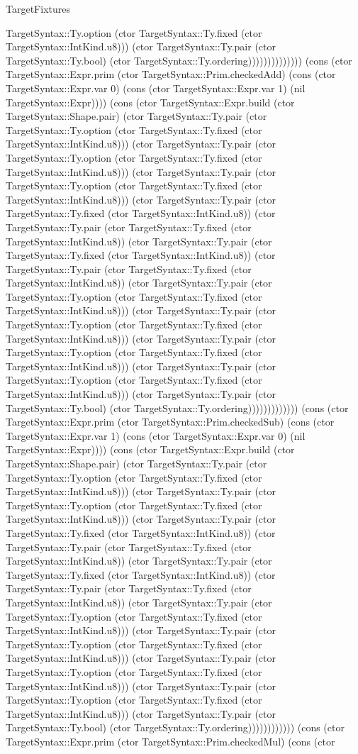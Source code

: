\begin{lexlean}{TargetFixtures}
\begin{semanticmodule}
{TargetSyntax::Ty.option (ctor TargetSyntax::Ty.fixed (ctor TargetSyntax::IntKind.u8))) (ctor TargetSyntax::Ty.pair (ctor TargetSyntax::Ty.bool) (ctor TargetSyntax::Ty.ordering)))))))))))))) (cons (ctor TargetSyntax::Expr.prim (ctor TargetSyntax::Prim.checkedAdd) (cons (ctor TargetSyntax::Expr.var 0) (cons (ctor TargetSyntax::Expr.var 1) (nil TargetSyntax::Expr)))) (cons (ctor TargetSyntax::Expr.build (ctor TargetSyntax::Shape.pair) (ctor TargetSyntax::Ty.pair (ctor TargetSyntax::Ty.option (ctor TargetSyntax::Ty.fixed (ctor TargetSyntax::IntKind.u8))) (ctor TargetSyntax::Ty.pair (ctor TargetSyntax::Ty.option (ctor TargetSyntax::Ty.fixed (ctor TargetSyntax::IntKind.u8))) (ctor TargetSyntax::Ty.pair (ctor TargetSyntax::Ty.option (ctor TargetSyntax::Ty.fixed (ctor TargetSyntax::IntKind.u8))) (ctor TargetSyntax::Ty.pair (ctor TargetSyntax::Ty.fixed (ctor TargetSyntax::IntKind.u8)) (ctor TargetSyntax::Ty.pair (ctor TargetSyntax::Ty.fixed (ctor TargetSyntax::IntKind.u8)) (ctor TargetSyntax::Ty.pair (ctor TargetSyntax::Ty.fixed (ctor TargetSyntax::IntKind.u8)) (ctor TargetSyntax::Ty.pair (ctor TargetSyntax::Ty.fixed (ctor TargetSyntax::IntKind.u8)) (ctor TargetSyntax::Ty.pair (ctor TargetSyntax::Ty.option (ctor TargetSyntax::Ty.fixed (ctor TargetSyntax::IntKind.u8))) (ctor TargetSyntax::Ty.pair (ctor TargetSyntax::Ty.option (ctor TargetSyntax::Ty.fixed (ctor TargetSyntax::IntKind.u8))) (ctor TargetSyntax::Ty.pair (ctor TargetSyntax::Ty.option (ctor TargetSyntax::Ty.fixed (ctor TargetSyntax::IntKind.u8))) (ctor TargetSyntax::Ty.pair (ctor TargetSyntax::Ty.option (ctor TargetSyntax::Ty.fixed (ctor TargetSyntax::IntKind.u8))) (ctor TargetSyntax::Ty.pair (ctor TargetSyntax::Ty.bool) (ctor TargetSyntax::Ty.ordering))))))))))))) (cons (ctor TargetSyntax::Expr.prim (ctor TargetSyntax::Prim.checkedSub) (cons (ctor TargetSyntax::Expr.var 1) (cons (ctor TargetSyntax::Expr.var 0) (nil TargetSyntax::Expr)))) (cons (ctor TargetSyntax::Expr.build (ctor TargetSyntax::Shape.pair) (ctor TargetSyntax::Ty.pair (ctor TargetSyntax::Ty.option (ctor TargetSyntax::Ty.fixed (ctor TargetSyntax::IntKind.u8))) (ctor TargetSyntax::Ty.pair (ctor TargetSyntax::Ty.option (ctor TargetSyntax::Ty.fixed (ctor TargetSyntax::IntKind.u8))) (ctor TargetSyntax::Ty.pair (ctor TargetSyntax::Ty.fixed (ctor TargetSyntax::IntKind.u8)) (ctor TargetSyntax::Ty.pair (ctor TargetSyntax::Ty.fixed (ctor TargetSyntax::IntKind.u8)) (ctor TargetSyntax::Ty.pair (ctor TargetSyntax::Ty.fixed (ctor TargetSyntax::IntKind.u8)) (ctor TargetSyntax::Ty.pair (ctor TargetSyntax::Ty.fixed (ctor TargetSyntax::IntKind.u8)) (ctor TargetSyntax::Ty.pair (ctor TargetSyntax::Ty.option (ctor TargetSyntax::Ty.fixed (ctor TargetSyntax::IntKind.u8))) (ctor TargetSyntax::Ty.pair (ctor TargetSyntax::Ty.option (ctor TargetSyntax::Ty.fixed (ctor TargetSyntax::IntKind.u8))) (ctor TargetSyntax::Ty.pair (ctor TargetSyntax::Ty.option (ctor TargetSyntax::Ty.fixed (ctor TargetSyntax::IntKind.u8))) (ctor TargetSyntax::Ty.pair (ctor TargetSyntax::Ty.option (ctor TargetSyntax::Ty.fixed (ctor TargetSyntax::IntKind.u8))) (ctor TargetSyntax::Ty.pair (ctor TargetSyntax::Ty.bool) (ctor TargetSyntax::Ty.ordering)))))))))))) (cons (ctor TargetSyntax::Expr.prim (ctor TargetSyntax::Prim.checkedMul) (cons (ctor }
\end{semanticmodule}
\end{lexlean}
